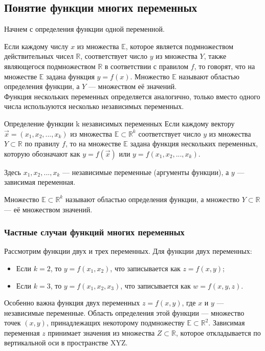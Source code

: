 \subsection{Понятие функции многих переменных}

Начнем с определения функции одной переменной.

Если каждому числу $x$ из множества $\mathbb{E}$, которое является подмножеством действительных чисел $\mathbb{R}$, соответствует число $y$ из множества $Y$, также являющегося подмножеством $\mathbb{R}$ в соответствии с правилом $f$, то говорят, что на множестве $\mathbb{E}$ задана функция $y = f(x)$. Множество $\mathbb{E}$ называют областью определения функции, а $Y$ — множеством её значений.\\

Функция нескольких переменных определяется аналогично, только вместо одного числа используются несколько независимых переменных.

\begin{tbox*}{Определение функции k независимых переменных}
	Если каждому вектору $\vec{x} = (x_1, x_2, ..., x_k)$ из множества $\mathbb{E} \subset \mathbb{R}^k$ соответствует число $y$ из множества $Y \subset \mathbb{R}$ по правилу $f$, то на множестве $\mathbb{E}$ задана функция нескольких переменных, которую обозначают как $y = f(\vec{x})$ или $y = f(x_1, x_2, ..., x_k)$.

	Здесь $x_1, x_2, ..., x_k$ — независимые переменные (аргументы функции), а $y$ — зависимая переменная.

	Множество $\mathbb{E} \subset \mathbb{R}^k$ называют областью определения функции, а множество $Y \subset \mathbb{R}$ — её множеством значений.
\end{tbox*}

\subsubsection{Частные случаи функций многих переменных}
Рассмотрим функции двух и трех переменных. Для функции двух переменных:

\begin{itemize}
	\item Если $k=2$, то $y = f(x_1, x_2)$, что записывается как $z = f(x, y)$;
	\item Если $k=3$, то $y = f(x_1, x_2, x_3)$, что записывается как $w = f(x, y, z)$.
\end{itemize}

Особенно важна функция двух переменных $z = f(x, y)$, где $x$ и $y$ — независимые переменные. Область определения этой функции — множество точек $(x, y)$, принадлежащих некоторому подмножеству $\mathbb{E} \subset \mathbb{R}^2$. Зависимая переменная $z$ принимает значения из множества $Z \subset \mathbb{R}$, которое откладывается по вертикальной оси в пространстве XYZ.

